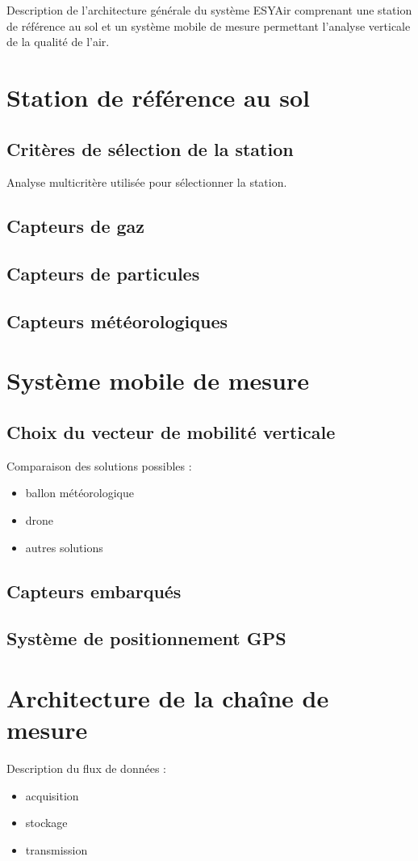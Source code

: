 Description de l'architecture générale du système ESYAir comprenant
une station de référence au sol et un système mobile de mesure
permettant l'analyse verticale de la qualité de l'air.

\section{Station de référence au sol}

\subsection{Critères de sélection de la station}

Analyse multicritère utilisée pour sélectionner la station.

\subsection{Capteurs de gaz}

\subsection{Capteurs de particules}

\subsection{Capteurs météorologiques}

\section{Système mobile de mesure}

\subsection{Choix du vecteur de mobilité verticale}

Comparaison des solutions possibles :
\begin{itemize}
\item ballon météorologique
\item drone
\item autres solutions
\end{itemize}

\subsection{Capteurs embarqués}

\subsection{Système de positionnement GPS}

\section{Architecture de la chaîne de mesure}

Description du flux de données :
\begin{itemize}
\item acquisition
\item stockage
\item transmission
\end{itemize}